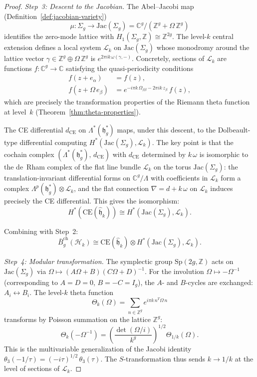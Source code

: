 \begin{proof}
\emph{Step~3: Descent to the Jacobian.}
The Abel--Jacobi map (Definition~\ref{def:jacobian-variety})
\[
\mu\colon \Sigma_g \to \mathrm{Jac}(\Sigma_g)
= \mathbb{C}^g / (\mathbb{Z}^g + \Omega\,\mathbb{Z}^g)
\]
identifies the zero-mode lattice with
$H_1(\Sigma_g, \mathbb{Z}) \cong \mathbb{Z}^{2g}$.
The level-$k$ central extension defines a local system
$\mathcal{L}_k$ on $\mathrm{Jac}(\Sigma_g)$ whose
monodromy around the lattice vector $\gamma \in
\mathbb{Z}^g \oplus \Omega\,\mathbb{Z}^g$ is
$e^{2\pi i k\,\omega(\gamma, -)}$.
Concretely, sections of $\mathcal{L}_k$ are functions
$f\colon \mathbb{C}^g \to \mathbb{C}$ satisfying the
quasi-periodicity conditions
\begin{align}
f(z + e_\alpha) &= f(z), \\
f(z + \Omega\, e_\beta) &= e^{-i\pi k\,\Omega_{\beta\beta}
  - 2\pi i k\, z_\beta}\, f(z),
\end{align}
which are precisely the transformation properties of
the Riemann theta function at level~$k$
(Theorem~\ref{thm:theta-properties}).

The CE differential $d_{\mathrm{CE}}$ on
$\Lambda^*(\mathfrak{h}_g^*)$ maps, under this descent, to the
Dolbeault-type differential computing
$H^*(\mathrm{Jac}(\Sigma_g), \mathcal{L}_k)$.  The key
point is that the cochain complex
$(\Lambda^*(\mathfrak{h}_g^*),\, d_{\mathrm{CE}})$ with
$d_{\mathrm{CE}}$ determined by $k\,\omega$ is isomorphic to
the de~Rham complex of the flat line bundle $\mathcal{L}_k$
on the torus $\mathrm{Jac}(\Sigma_g)$: the translation-invariant
differential forms on $\mathbb{C}^g/\Lambda$ with coefficients
in $\mathcal{L}_k$ form a complex
$\Lambda^p(\mathfrak{h}_g^*) \otimes \mathcal{L}_k$, and the
flat connection $\nabla = d + k\,\omega$ on $\mathcal{L}_k$
induces precisely the CE differential.
This gives the isomorphism:
\[
H^*(\mathrm{CE}(\hat{\mathfrak{h}}_k))
\cong H^*(\mathrm{Jac}(\Sigma_g), \mathcal{L}_k).
\]

Combining with Step~2:
\[
\bar{B}^{\mathrm{ch}}_g(\mathcal{H}_k)
\cong \mathrm{CE}(\hat{\mathfrak{h}}_k)
\otimes H^*(\mathrm{Jac}(\Sigma_g), \mathcal{L}_k).
\]

\emph{Step~4: Modular transformation.}
The symplectic group $\mathrm{Sp}(2g, \mathbb{Z})$ acts on
$\mathrm{Jac}(\Sigma_g)$ via
$\Omega \mapsto (A\Omega + B)(C\Omega + D)^{-1}$.
For the involution $\Omega \mapsto -\Omega^{-1}$
(corresponding to $A = D = 0$, $B = -C = I_g$),
the $A$- and $B$-cycles are exchanged:
$A_i \leftrightarrow B_i$.  The level-$k$ theta function
\[
\Theta_k(\Omega)
= \sum_{n \in \mathbb{Z}^g} e^{i\pi k\, n^T \Omega\, n}
\]
transforms by Poisson summation on the lattice
$\mathbb{Z}^g$:
\[
\Theta_k(-\Omega^{-1})
= \left(\frac{\det(\Omega/i)}{k^g}\right)^{1/2}
  \Theta_{1/k}(\Omega).
\]
This is the multivariable generalization of the Jacobi
identity $\theta_3(-1/\tau) = (-i\tau)^{1/2}\,\theta_3(\tau)$.
The $S$-transformation thus sends $k \to 1/k$ at the level
of sections of $\mathcal{L}_k$.


\end{proof}
